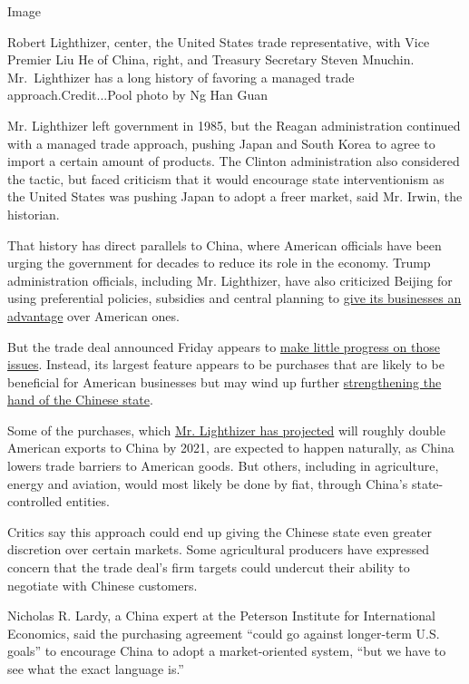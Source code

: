 Image

Robert Lighthizer, center, the United States trade representative, with
Vice Premier Liu He of China, right, and Treasury Secretary Steven
Mnuchin. Mr.~Lighthizer has a long history of favoring a managed trade
approach.Credit...Pool photo by Ng Han Guan

Mr. Lighthizer left government in 1985, but the Reagan administration
continued with a managed trade approach, pushing Japan and South Korea
to agree to import a certain amount of products. The Clinton
administration also considered the tactic, but faced criticism that it
would encourage state interventionism as the United States was pushing
Japan to adopt a freer market, said Mr. Irwin, the historian.

That history has direct parallels to China, where American officials
have been urging the government for decades to reduce its role in the
economy. Trump administration officials, including Mr. Lighthizer, have
also criticized Beijing for using preferential policies, subsidies and
central planning to
\href{https://www.nytimes3xbfgragh.onion/2019/05/12/business/china-trump-trade-subsidies.html}{give
its businesses an advantage} over American ones.

But the trade deal announced Friday appears to
\href{https://www.nytimes3xbfgragh.onion/2019/12/13/business/economy/china-trade-deal.html}{make
little progress on those issues}. Instead, its largest feature appears
to be purchases that are likely to be beneficial for American businesses
but may wind up further
\href{https://www.nytimes3xbfgragh.onion/2019/04/01/us/politics/us-china-trade-trump.html}{strengthening
the hand of the Chinese state}.

Some of the purchases, which
\href{https://www.nytimes3xbfgragh.onion/2019/12/15/business/economy/us-china-trade-deal.html}{Mr.
Lighthizer has projected} will roughly double American exports to China
by 2021, are expected to happen naturally, as China lowers trade
barriers to American goods. But others, including in agriculture, energy
and aviation, would most likely be done by fiat, through China's
state-controlled entities.

Critics say this approach could end up giving the Chinese state even
greater discretion over certain markets. Some agricultural producers
have expressed concern that the trade deal's firm targets could undercut
their ability to negotiate with Chinese customers.

Nicholas R. Lardy, a China expert at the Peterson Institute for
International Economics, said the purchasing agreement ``could go
against longer-term U.S. goals'' to encourage China to adopt a
market-oriented system, ``but we have to see what the exact language
is.''

